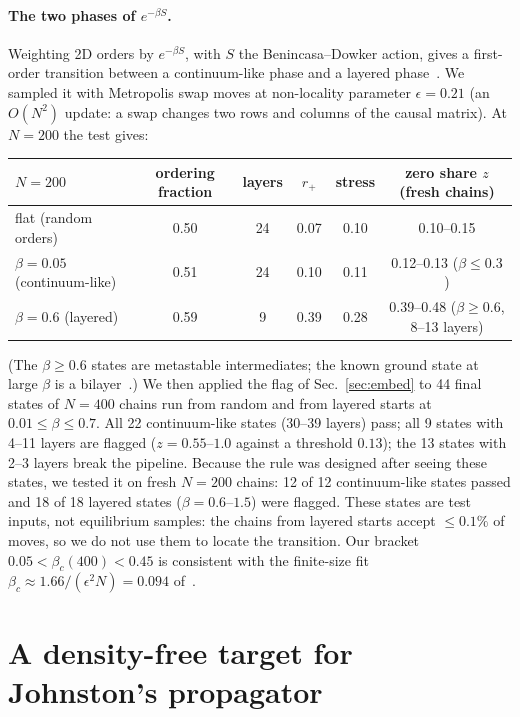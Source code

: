 \documentclass[11pt,a4paper]{article}
\begin{document}
\paragraph{The two phases of $e^{-\beta S}$.} Weighting 2D orders by $e^{-\beta S}$, with $S$ the Benincasa--Dowker action, gives a first-order transition between a continuum-like phase and a layered phase~\cite{BHS08,Surya12,GOS18}. We sampled it with Metropolis swap moves at non-locality parameter $\epsilon=0.21$ (an $O(N^2)$ update: a swap changes two rows and columns of the causal matrix). At $N=200$ the test gives:
\begin{center}\small
\begin{tabular}{@{}lccccc@{}}
\toprule
$N=200$ & ordering fraction & layers & $r_+$ & stress & zero share $z$ (fresh chains)\\
\midrule
flat (random orders) & 0.50 & 24 & 0.07 & 0.10 & 0.10--0.15\\
$\beta=0.05$ (continuum-like) & 0.51 & 24 & 0.10 & 0.11 & 0.12--0.13 ($\beta\le0.3$)\\
$\beta=0.6$ (layered) & 0.59 & 9 & 0.39 & 0.28 & 0.39--0.48 ($\beta\ge0.6$, 8--13 layers)\\
\bottomrule
\end{tabular}
\end{center}
(The $\beta\ge0.6$ states are metastable intermediates; the known ground state at large $\beta$ is a bilayer~\cite{CunninghamSurya19}.) We then applied the flag of Sec.~\ref{sec:embed} to 44 final states of $N=400$ chains run from random and from layered starts at $0.01\le\beta\le0.7$. All 22 continuum-like states (30--39 layers) pass; all 9 states with 4--11 layers are flagged ($z=0.55$--$1.0$ against a threshold $0.13$); the 13 states with 2--3 layers break the pipeline. Because the rule was designed after seeing these states, we tested it on fresh $N=200$ chains: 12 of 12 continuum-like states passed and 18 of 18 layered states ($\beta=0.6$--$1.5$) were flagged. These states are test inputs, not equilibrium samples: the chains from layered starts accept $\le0.1\%$ of moves, so we do not use them to locate the transition. Our bracket $0.05<\beta_c(400)<0.45$ is consistent with the finite-size fit $\beta_c\approx1.66/(\epsilon^2N)=0.094$ of~\cite{GOS18}.

\section{A density-free target for Johnston's propagator}\label{sec:prop}
\end{document}
